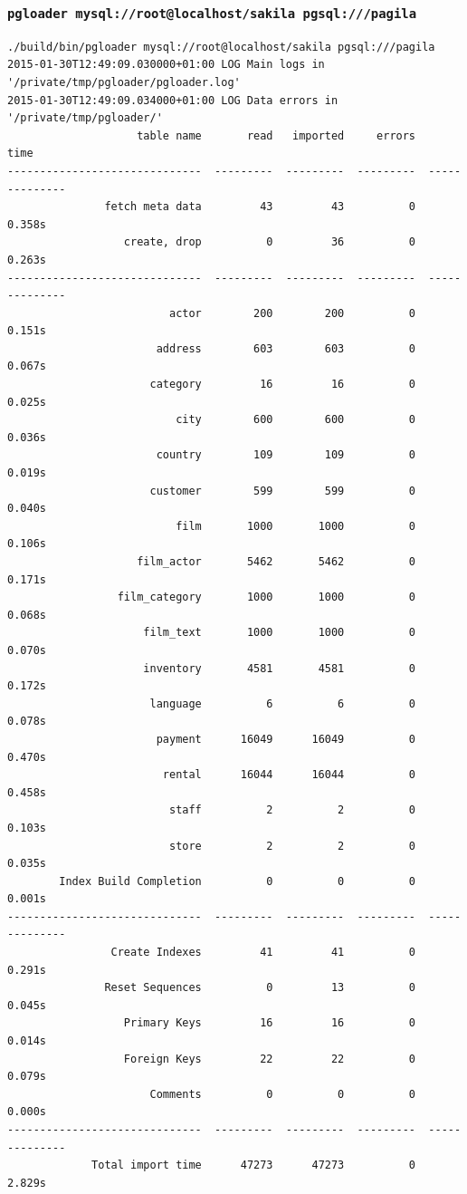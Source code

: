\documentclass{beamer}
\begin{document}
\begin{frame}[fragile]
  \frametitle{\small{\texttt{pgloader mysql://root@localhost/sakila pgsql:///pagila}}}

\begin{Verbatim}[fontsize=\tiny]
./build/bin/pgloader mysql://root@localhost/sakila pgsql:///pagila
2015-01-30T12:49:09.030000+01:00 LOG Main logs in '/private/tmp/pgloader/pgloader.log'
2015-01-30T12:49:09.034000+01:00 LOG Data errors in '/private/tmp/pgloader/'
                    table name       read   imported     errors            time
------------------------------  ---------  ---------  ---------  --------------
               fetch meta data         43         43          0          0.358s
                  create, drop          0         36          0          0.263s
------------------------------  ---------  ---------  ---------  --------------
                         actor        200        200          0          0.151s
                       address        603        603          0          0.067s
                      category         16         16          0          0.025s
                          city        600        600          0          0.036s
                       country        109        109          0          0.019s
                      customer        599        599          0          0.040s
                          film       1000       1000          0          0.106s
                    film_actor       5462       5462          0          0.171s
                 film_category       1000       1000          0          0.068s
                     film_text       1000       1000          0          0.070s
                     inventory       4581       4581          0          0.172s
                      language          6          6          0          0.078s
                       payment      16049      16049          0          0.470s
                        rental      16044      16044          0          0.458s
                         staff          2          2          0          0.103s
                         store          2          2          0          0.035s
        Index Build Completion          0          0          0          0.001s
------------------------------  ---------  ---------  ---------  --------------
                Create Indexes         41         41          0          0.291s
               Reset Sequences          0         13          0          0.045s
                  Primary Keys         16         16          0          0.014s
                  Foreign Keys         22         22          0          0.079s
                      Comments          0          0          0          0.000s
------------------------------  ---------  ---------  ---------  --------------
             Total import time      47273      47273          0          2.829s
\end{Verbatim}
\end{frame}
\end{document}
